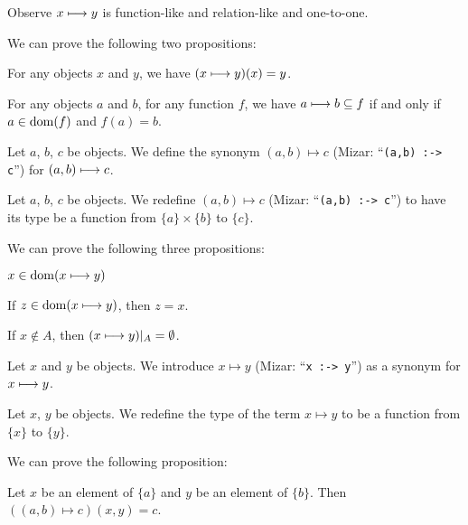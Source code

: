 \documentclass{article}
\begin{document}
Observe $x\longmapsto  y$ is function-like and relation-like and one-to-one.

We can prove the following two propositions:
\begin{thm}
\item\label{funcop1:72} For any objects $x$ and $y$, we have
  $(x\longmapsto y)(x)=y$.
\item\label{funcop1:73} For any objects $a$ and $b$, for any function
  $f$, we have $a\longmapsto b\subseteq f$ if and only if $a\in\operatorname{dom}(f)$
  and $f(a)=b$.
\end{thm}

\begin{notation}
Let $a$, $b$, $c$ be objects.
We define the synonym $(a,b)\mapsto c$ (Mizar: ``\verb#(a,b) :-> c#'')
for $(a,b)\longmapsto c$.
\end{notation}

\begin{definition}
Let $a$, $b$, $c$ be objects.
We redefine $(a,b)\mapsto c$ (Mizar: ``\verb#(a,b) :-> c#'')
to have its type be a function from $\{a\}\times\{b\}$ to $\{c\}$.
\end{definition}

We can prove the following three propositions:
\begin{thm}
\item\label{funcop1:74} $x\in\operatorname{dom}(x\longmapsto y)$
\item\label{funcop1:75} If $z\in\operatorname{dom}(x\longmapsto y)$, then $z=x$.
\item\label{funcop1:76} If $x\notin A$, then $(x\longmapsto y)|_{A}=\emptyset$.
\end{thm}

\begin{notation}%
Let $x$ and $y$ be objects. We introduce $x\mapsto y$ (Mizar:
``\verb#x :-> y#'') as a synonym for $x\longmapsto y$.
\end{notation}

\begin{definition}
Let $x$, $y$ be objects.
We redefine the type of the term $x\mapsto y$ to be a function from
$\{x\}$ to $\{y\}$.
\end{definition}

We can prove the following proposition:
\begin{thm}
\item\label{funcop1:77} Let $x$ be an element of $\{a\}$ and $y$ be an
  element of $\{b\}$. Then $((a,b)\mapsto c)(x,y)=c$.
\end{thm}
\end{document}
